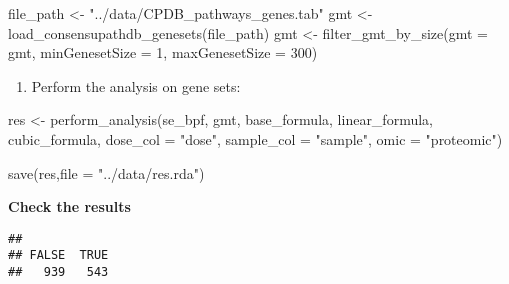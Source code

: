 \documentclass[
]{article}
\newenvironment{Shaded}{\begin{snugshade}}{\end{snugshade}}
\newcommand{\AttributeTok}[1]{\textcolor[rgb]{0.77,0.63,0.00}{#1}}
\newcommand{\DecValTok}[1]{\textcolor[rgb]{0.00,0.00,0.81}{#1}}
\newcommand{\FloatTok}[1]{\textcolor[rgb]{0.00,0.00,0.81}{#1}}
\newcommand{\FunctionTok}[1]{\textcolor[rgb]{0.00,0.00,0.00}{#1}}
\newcommand{\NormalTok}[1]{#1}
\newcommand{\OtherTok}[1]{\textcolor[rgb]{0.56,0.35,0.01}{#1}}
\newcommand{\SpecialCharTok}[1]{\textcolor[rgb]{0.00,0.00,0.00}{#1}}
\newcommand{\StringTok}[1]{\textcolor[rgb]{0.31,0.60,0.02}{#1}}
\providecommand{\tightlist}{%
  \setlength{\itemsep}{0pt}\setlength{\parskip}{0pt}}
\begin{document}
\begin{Shaded}
\begin{Highlighting}[]
\NormalTok{file\_path }\OtherTok{\textless{}{-}} \StringTok{"../data/CPDB\_pathways\_genes.tab"}
\NormalTok{gmt }\OtherTok{\textless{}{-}} \FunctionTok{load\_consensupathdb\_genesets}\NormalTok{(file\_path)}
\NormalTok{gmt }\OtherTok{\textless{}{-}} \FunctionTok{filter\_gmt\_by\_size}\NormalTok{(}\AttributeTok{gmt =}\NormalTok{ gmt, }\AttributeTok{minGenesetSize =} \DecValTok{1}\NormalTok{, }\AttributeTok{maxGenesetSize =} \DecValTok{300}\NormalTok{)}
\end{Highlighting}
\end{Shaded}

\begin{enumerate}
\def\labelenumi{\arabic{enumi}.}
\setcounter{enumi}{4}
\tightlist
\item
  Perform the analysis on gene sets:
\end{enumerate}

\begin{Shaded}
\begin{Highlighting}[]
\NormalTok{res }\OtherTok{\textless{}{-}} \FunctionTok{perform\_analysis}\NormalTok{(se\_bpf, }
\NormalTok{                        gmt, }
\NormalTok{                        base\_formula, }
\NormalTok{                        linear\_formula, }
\NormalTok{                        cubic\_formula, }
                        \AttributeTok{dose\_col =} \StringTok{"dose"}\NormalTok{, }
                        \AttributeTok{sample\_col =} \StringTok{"sample"}\NormalTok{, }
                        \AttributeTok{omic =} \StringTok{"proteomic"}\NormalTok{)}

\FunctionTok{save}\NormalTok{(res,}\AttributeTok{file =} \StringTok{"../data/res.rda"}\NormalTok{)}
\end{Highlighting}
\end{Shaded}

\textbf{Check the results}

\begin{Shaded}
\end{Shaded}

\begin{verbatim}
## 
## FALSE  TRUE 
##   939   543
\end{verbatim}
\end{document}
